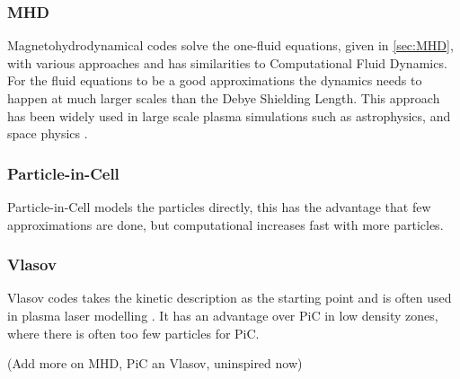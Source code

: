 	\subsubsection{MHD}
		Magnetohydrodynamical codes solve the one-fluid equations, given in \cref{sec:MHD},
		with various approaches and has
		similarities to Computational Fluid Dynamics. For the fluid equations
		to be a good approximations the dynamics needs to happen at much larger scales
		than the Debye Shielding Length. This approach has been widely used in large scale
		plasma simulations such as astrophysics, \citep{hawley_numerical_1995} and space physics
		\citep{watanabe_global_1990}.

	\subsubsection{Particle-in-Cell}
		Particle-in-Cell models the particles directly, this has the advantage that
		few approximations are done, but computational increases fast with more particles.

	\subsubsection{Vlasov}
		Vlasov codes takes the kinetic description as the starting point and is often used
		in plasma laser modelling \citep{bertrand_nonperiodic_1990}. It has an advantage over
		PiC in low density zones, where there is often too few particles for PiC.

		(Add more on MHD, PiC an Vlasov, uninspired now)
